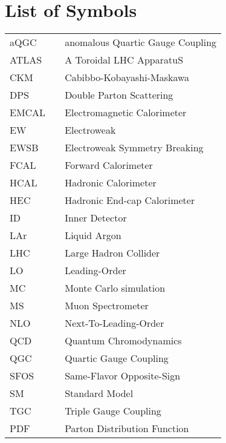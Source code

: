 \chapter*{List of Symbols}
  \begin{tabular}{lp{}p{}}
    aQGC        & \dotfill & anomalous Quartic Gauge Coupling \\
    ATLAS       & \dotfill & A Toroidal LHC ApparatuS \\
    CKM         & \dotfill & Cabibbo-Kobayashi-Maskawa \\
    DPS         & \dotfill & Double Parton Scattering \\
    EMCAL       & \dotfill & Electromagnetic Calorimeter \\
    EW          & \dotfill & Electroweak \\
    EWSB        & \dotfill & Electroweak Symmetry Breaking \\
    FCAL        & \dotfill & Forward Calorimeter \\
    HCAL        & \dotfill & Hadronic Calorimeter \\
    HEC         & \dotfill & Hadronic End-cap Calorimeter \\
    ID          & \dotfill & Inner Detector \\
    LAr         & \dotfill & Liquid Argon \\
    LHC         & \dotfill & Large Hadron Collider \\
    LO          & \dotfill & Leading-Order \\
    MC          & \dotfill & Monte Carlo simulation \\
    MS          & \dotfill & Muon Spectrometer \\
    NLO         & \dotfill & Next-To-Leading-Order \\
    QCD         & \dotfill & Quantum Chromodynamics \\
    QGC         & \dotfill & Quartic Gauge Coupling \\
    SFOS        & \dotfill & Same-Flavor Opposite-Sign \\
    SM          & \dotfill & Standard Model  \\
    TGC         & \dotfill & Triple Gauge Coupling \\
    PDF         & \dotfill & Parton Distribution Function \\



  \end{tabular}
